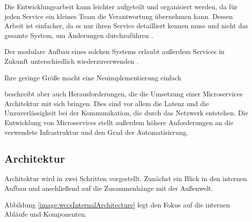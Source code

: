         Die Entwicklungsarbeit kann leichter aufgeteilt und organisiert werden,
        da für jeden Service ein kleines Team die Verantwortung übernehmen kann.
        Dessen Arbeit ist einfacher, da es nur ihren Service detailliert kennen muss
        und nicht das gesamte System, um Änderungen durchzuführen
        \cite[Kapitel 1.2.5]{newman:microservices}.

        Der modulare Aufbau eines solchen Systems erlaubt außerdem Services
        in Zukunft unterschiedlich wiederzuverwenden
        \cite[Kapitel 1.2.6]{newman:microservices}.

        Ihre geringe Größe macht eine Neuimplementierung einfach
        \cite[Kapitel 1.2.7]{newman:microservices}

        \citet[Kapitel 6.1-6.3]{wolff:microservices} beschreibt aber auch
        Herausforderungen, die die Umsetzung einer Microservices Architektur mit sich bringen.
        Dies sind vor allem die Latenz und die Unzuverlässigkeit bei der Kommunikation,
        die durch das Netzwerk entstehen.
        Die Entwicklung von Microservices stellt außerdem höhere Anforderungen an die
        verwendete Infrastruktur und den Grad der Automatisierung.

    \subsection{Architektur}
        Architektur wird in zwei Schritten vorgestellt.
        Zunächst ein Blick in den internen Aufbau und anschließend auf die Zusammenhänge mit der Außenwelt.
        
        Abbildung \ref{image:wccsInternalArchitecture} legt den Fokus auf die
        internen Abläufe und Komponenten.

